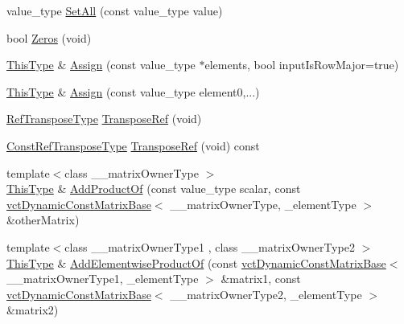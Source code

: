 \begin{DoxyCompactItemize}
\item 
value\+\_\+type \hyperlink{classvct_dynamic_matrix_base_ad7e53be82e28a75b78ed3bd8e4923035}{Set\+All} (const value\+\_\+type value)
\item 
bool \hyperlink{classvct_dynamic_matrix_base_af0acec85f5189a08af876fbb3fbb2f59}{Zeros} (void)
\item 
\hyperlink{classvct_dynamic_const_matrix_base_ac4ff48cbe4d9de3fdef5a02447ffb9db}{This\+Type} \& \hyperlink{classvct_dynamic_matrix_base_a307776c7d6b195a515889143025c8adb}{Assign} (const value\+\_\+type $\ast$elements, bool input\+Is\+Row\+Major=true)
\item 
\hyperlink{classvct_dynamic_const_matrix_base_ac4ff48cbe4d9de3fdef5a02447ffb9db}{This\+Type} \& \hyperlink{classvct_dynamic_matrix_base_a56e29fd345cfba47b1a38c2d01e58c06}{Assign} (const value\+\_\+type element0,...)
\item 
\hyperlink{classvct_dynamic_const_matrix_base_afff0f3bee56a8562e0ec772b35e24475}{Ref\+Transpose\+Type} \hyperlink{classvct_dynamic_matrix_base_a73bb42861eed892ff9c8b96a0be72346}{Transpose\+Ref} (void)
\item 
\hyperlink{classvct_dynamic_const_matrix_base_a2ee053ef5a591f470076e2a0c215fa44}{Const\+Ref\+Transpose\+Type} \hyperlink{classvct_dynamic_matrix_base_afc8fcb2076b6a70b60c2f45b31e2b2c3}{Transpose\+Ref} (void) const 
\item 
{\footnotesize template$<$class \+\_\+\+\_\+matrix\+Owner\+Type $>$ }\\\hyperlink{classvct_dynamic_const_matrix_base_ac4ff48cbe4d9de3fdef5a02447ffb9db}{This\+Type} \& \hyperlink{classvct_dynamic_matrix_base_a460d89e570f8f6594275e14e1c98181a}{Add\+Product\+Of} (const value\+\_\+type scalar, const \hyperlink{classvct_dynamic_const_matrix_base}{vct\+Dynamic\+Const\+Matrix\+Base}$<$ \+\_\+\+\_\+matrix\+Owner\+Type, \+\_\+element\+Type $>$ \&other\+Matrix)
\item 
{\footnotesize template$<$class \+\_\+\+\_\+matrix\+Owner\+Type1 , class \+\_\+\+\_\+matrix\+Owner\+Type2 $>$ }\\\hyperlink{classvct_dynamic_const_matrix_base_ac4ff48cbe4d9de3fdef5a02447ffb9db}{This\+Type} \& \hyperlink{classvct_dynamic_matrix_base_ac0729a80f95b795ae3beb75a9ac083a0}{Add\+Elementwise\+Product\+Of} (const \hyperlink{classvct_dynamic_const_matrix_base}{vct\+Dynamic\+Const\+Matrix\+Base}$<$ \+\_\+\+\_\+matrix\+Owner\+Type1, \+\_\+element\+Type $>$ \&matrix1, const \hyperlink{classvct_dynamic_const_matrix_base}{vct\+Dynamic\+Const\+Matrix\+Base}$<$ \+\_\+\+\_\+matrix\+Owner\+Type2, \+\_\+element\+Type $>$ \&matrix2)

\end{DoxyCompactItemize}
